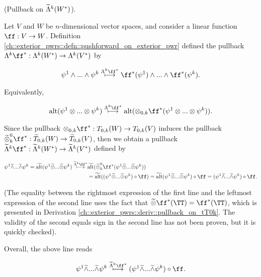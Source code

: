 \begin{deriv}
\label{ch::exterior_pwrs::deriv::pullback_on_exterior_pwr_of_actual_fns}
    (Pullback on $\widetilde{\Lambda}^k(W^*)$).
    
    Let $V$ and $W$ be $n$-dimensional vector spaces, and consider a linear function $\ff:V \rightarrow W$. Definition \ref{ch::exterior_pwrs::defn::pushforward_on_exterior_pwr} defined the pullback $\Lambda^k \ff^*:\Lambda^k(W^*) \rightarrow \Lambda^k(V^*)$ by
    
    \begin{align*}
        \psi^1 \wedge ... \wedge \psi^k \overset{\Lambda^k \ff^*}{\longmapsto} \ff^*(\psi^1) \wedge ... \wedge \ff^*(\psi^k).
    \end{align*}
    
    Equivalently,
    
    \begin{align*}
        \alt(\psi^1 \otimes ... \otimes \psi^k) \overset{\Lambda^k \ff^*}{\longmapsto} \alt(\otimes_{0, k} \ff^*(\psi^1 \otimes ... \otimes \psi^k)).
    \end{align*}
    
    Since the pullback $\otimes_{0, k} \ff^*:T_{0,k}(W) \rightarrow T_{0,k}(V)$ induces the pullback $\totimes^0_k \ff^*:\tT_{0,k}(W) \rightarrow \tT_{0,k}(V)$, then we obtain a pullback $\tLambda^k \ff^*:\tLambda^k(W^*) \rightarrow \tLambda^k(V^*)$ defined by
    
    \begin{align*}
        \psi^1 \twedge ... \twedge \psi^k = \talt(\psi^1 \totimes ... \totimes \psi^k) \overset{\tLambda^k \ff^*}{\longmapsto}
        &\talt(\totimes^0_k \ff^*(\psi^1 \totimes ... \totimes \psi^k)) \\ 
        &= \talt((\psi^1 \totimes ... \totimes \psi^k) \circ \ff) = \talt(\psi^1 \totimes ... \totimes \psi^k) \circ \ff
        = (\psi^1 \twedge ... \twedge \psi^k) \circ \ff.
    \end{align*}
    
    (The equality between the rightmost expression of the first line and the leftmost expression of the second line uses the fact that $\totimes \ff^*(\TT) = \ff^*(\TT)$, which is presented in Derivation \ref{ch::exterior_pwrs::deriv::pullback_on_tT0k}. The validity of the second equals sign in the second line has not been proven, but it is quickly checked).
    
    Overall, the above line reads
    
    \begin{align*}
        \psi^1 \twedge ... \twedge \psi^k \overset{\tLambda^k \ff^*}{\longmapsto} (\psi^1 \twedge ... \twedge \psi^k) \circ \ff.
    \end{align*}
    

\end{deriv}
